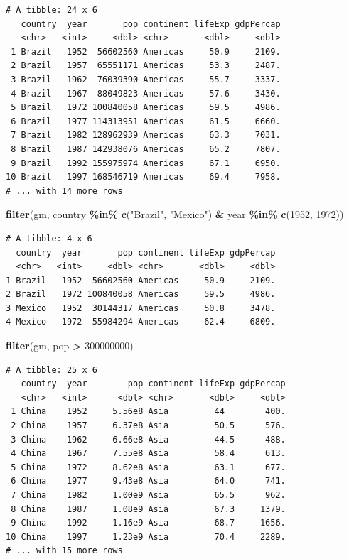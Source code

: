 \documentclass[
]{krantz}
\makeatletter
\newenvironment{Shaded}{\begin{snugshade}}{\end{snugshade}}
\newcommand{\DecValTok}[1]{\textcolor[rgb]{0.06,0.06,0.06}{#1}}
\newcommand{\KeywordTok}[1]{\textcolor[rgb]{0.27,0.27,0.27}{\textbf{#1}}}
\newcommand{\NormalTok}[1]{#1}
\newcommand{\OperatorTok}[1]{\textcolor[rgb]{0.43,0.43,0.43}{\textbf{#1}}}
\newcommand{\StringTok}[1]{\textcolor[rgb]{0.5,0.5,0.5}{#1}}
\newenvironment{kframe}{%
\medskip{}
\setlength{\fboxsep}{.8em}
 \def\at@end@of@kframe{}%
 \ifinner\ifhmode%
  \def\at@end@of@kframe{\end{minipage}}%
  \begin{minipage}{\columnwidth}%
 \fi\fi%
 \def\FrameCommand##1{\hskip\@totalleftmargin \hskip-\fboxsep
 \colorbox{shadecolor}{##1}\hskip-\fboxsep
     \hskip-\linewidth \hskip-\@totalleftmargin \hskip\columnwidth}%
 \MakeFramed {\advance\hsize-\width
   \@totalleftmargin\z@ \linewidth\hsize
   \@setminipage}}%
 {\par\unskip\endMakeFramed%
 \at@end@of@kframe}
\renewenvironment{Shaded}{\begin{kframe}}{\end{kframe}}
\makeatother
\begin{document}
\begin{verbatim}
# A tibble: 24 x 6
   country  year       pop continent lifeExp gdpPercap
   <chr>   <int>     <dbl> <chr>       <dbl>     <dbl>
 1 Brazil   1952  56602560 Americas     50.9     2109.
 2 Brazil   1957  65551171 Americas     53.3     2487.
 3 Brazil   1962  76039390 Americas     55.7     3337.
 4 Brazil   1967  88049823 Americas     57.6     3430.
 5 Brazil   1972 100840058 Americas     59.5     4986.
 6 Brazil   1977 114313951 Americas     61.5     6660.
 7 Brazil   1982 128962939 Americas     63.3     7031.
 8 Brazil   1987 142938076 Americas     65.2     7807.
 9 Brazil   1992 155975974 Americas     67.1     6950.
10 Brazil   1997 168546719 Americas     69.4     7958.
# ... with 14 more rows
\end{verbatim}

\begin{Shaded}
\begin{Highlighting}[]
\KeywordTok{filter}\NormalTok{(gm, country }\OperatorTok{\%in\%}\StringTok{ }\KeywordTok{c}\NormalTok{(}\StringTok{"Brazil"}\NormalTok{, }\StringTok{"Mexico"}\NormalTok{) }\OperatorTok{\&}\StringTok{ }\NormalTok{year }\OperatorTok{\%in\%}\StringTok{ }\KeywordTok{c}\NormalTok{(}\DecValTok{1952}\NormalTok{, }\DecValTok{1972}\NormalTok{))}
\end{Highlighting}
\end{Shaded}

\begin{verbatim}
# A tibble: 4 x 6
  country  year       pop continent lifeExp gdpPercap
  <chr>   <int>     <dbl> <chr>       <dbl>     <dbl>
1 Brazil   1952  56602560 Americas     50.9     2109.
2 Brazil   1972 100840058 Americas     59.5     4986.
3 Mexico   1952  30144317 Americas     50.8     3478.
4 Mexico   1972  55984294 Americas     62.4     6809.
\end{verbatim}

\begin{Shaded}
\begin{Highlighting}[]
\KeywordTok{filter}\NormalTok{(gm, pop }\OperatorTok{\textgreater{}}\StringTok{ }\DecValTok{300000000}\NormalTok{)}
\end{Highlighting}
\end{Shaded}

\begin{verbatim}
# A tibble: 25 x 6
   country  year        pop continent lifeExp gdpPercap
   <chr>   <int>      <dbl> <chr>       <dbl>     <dbl>
 1 China    1952     5.56e8 Asia         44        400.
 2 China    1957     6.37e8 Asia         50.5      576.
 3 China    1962     6.66e8 Asia         44.5      488.
 4 China    1967     7.55e8 Asia         58.4      613.
 5 China    1972     8.62e8 Asia         63.1      677.
 6 China    1977     9.43e8 Asia         64.0      741.
 7 China    1982     1.00e9 Asia         65.5      962.
 8 China    1987     1.08e9 Asia         67.3     1379.
 9 China    1992     1.16e9 Asia         68.7     1656.
10 China    1997     1.23e9 Asia         70.4     2289.
# ... with 15 more rows
\end{verbatim}
\end{document}
